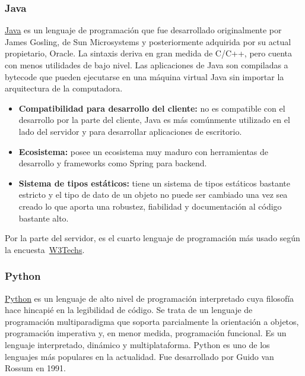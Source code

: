 \subsubsection{Java}

\href{https://es.wikipedia.org/w/index.php?title=Java_(lenguaje_de_programaci%C3%B3n)&oldid=161108422}{Java} es un lenguaje de programación que fue desarrollado originalmente por James Gosling, de Sun Microsystems y posteriormente adquirida por su actual propietario, Oracle. La sintaxis deriva en gran medida de C/C++, pero cuenta con menos utilidades de bajo nivel. Las aplicaciones de Java son compiladas a bytecode que pueden ejecutarse en una máquina virtual Java sin importar la arquitectura de la computadora.

\begin{itemize}
    \item[\mal] \textbf{Compatibilidad para desarrollo del cliente:} no es compatible con el desarrollo por la parte del cliente, Java es más comúnmente utilizado en el lado del servidor y para desarrollar aplicaciones de escritorio. 
    \item[\bien] \textbf{Ecosistema:} posee un ecosistema muy maduro con herramientas de desarrollo y frameworks como Spring para backend.
    \item[\esp] \textbf{Sistema de tipos estáticos:} tiene un sistema de tipos estáticos bastante estricto y el tipo de dato de un objeto no puede ser cambiado una vez sea creado lo que aporta una robustez, fiabilidad y documentación al código bastante alto.
\end{itemize}

Por la parte del servidor, es el cuarto lenguaje de programación más usado según la encuesta~\href{https://w3techs.com/technologies/overview/programming_language}{W3Techs}.

\subsubsection{Python}

\href{https://es.wikipedia.org/w/index.php?title=Python&oldid=161467974}{Python} es un lenguaje de alto nivel de programación interpretado cuya filosofía hace hincapié en la legibilidad de código. Se trata de un lenguaje de programación multiparadigma que soporta parcialmente la orientación a objetos, programación imperativa y, en menor medida, programación funcional. Es un lenguaje interpretado, dinámico y multiplataforma. Python es uno de los lenguajes más populares en la actualidad. Fue desarrollado por Guido van Rossum en 1991.


